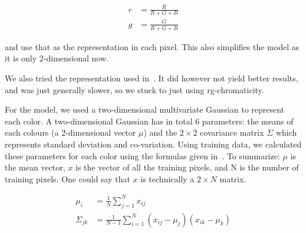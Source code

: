 \begin{align}
  r &= \frac{R}{R+G+B}\\
  g &= \frac{G}{R+G+B}
\end{align}

and use that as the representation in each pixel. This also simplifies the model
as it is only 2-dimensional now.

We also tried the representation used in~\cite{balkenius2007finding}. It did
however not yield better results, and was just generally slower, so we stuck to
just using rg-chromaticity.

For the model, we used a two-dimensional multivariate Gaussian to represent each
color. A two-dimensional Gaussian has in total 6 parameters: the means of each
colours (a 2-dimensional vector $\mu$) and the $2\times 2$ covariance matrix $\Sigma$
which represents standard deviation and co-variation. Using training data, we
calculated these parameters for each color using the formulas given
in~\cite{smean}. To summarize: $\mu$ is the mean vector, $x$ is the vector of all the
training pixels, and N is the number of training pixels. One could say that $x$ is
technically a $2\times N$ matrix.

\begin{align}
  \mu_i&=\frac{1}{N}\sum_{j=1}^Nx_{ij}\\
  \Sigma_{jk}&=\frac{1}{N-1}\sum_{i=1}^N(x_{ij}-\mu_j)(x_{ik}-\mu_k)
\end{align}

